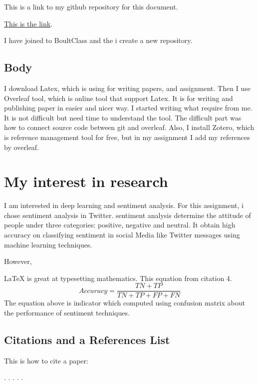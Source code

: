 \documentclass[a4paper]{article}
\begin{document}
This is a link to my github repository for this document.


\href{https://github.com/BoultClasses/CS-Research1.git}{This is the link}.

I have joined to BoultClass and the i create a new repository.

\subsection{Body}
I download Latex, which is using for writing papers, and assignment. Then I use Overleaf tool, which is online tool that support Latex. It is for writing and publishing paper in easier and nicer way. I started writing what require from me. It is not difficult but need time to understand the tool. The difficult part was how to connect  source code between git and overleaf. Also, 
I install Zotero, which is reference management tool for free, but in my assignment I add my references by overleaf.


\section{My interest in research }
  I am interested in deep learning and sentiment analysis. For this assignment, i chose sentiment analysis in Twitter.  sentiment analysis determine the attitude of people under three categories: positive, negative and neutral. It obtain high accuracy on classifying sentiment in social Media like Twitter messages using machine learning techniques.
  
  However, 

\LaTeX{} is great at typesetting mathematics. This equation from citation 4.  
\[Accuracy = \frac{TN + TP }{TN + TP + FP + FN }
      \]
      The equation above is indicator which computed using confusion matrix about the performance of sentiment techniques.
      
      
      
      
\subsection {Citations and a References List}



This is how to cite a paper:

\cite{patil2015sentiment}.
\cite{agarwal2011sentiment}.
\cite{go2009twitter}. 
\cite{desai2016techniques}.
\cite{rathan2017every}.







\end{document}

